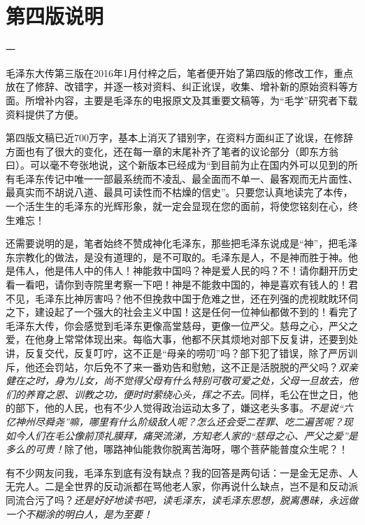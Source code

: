\documentclass[../../dazhuan.tex]{subfiles}
\begin{document}
\clearpage
\chapter*{第四版说明}

{\centering {}\kaishu 一 \par}                            
                        
毛泽东大传第三版在2016年1月付梓之后，笔者便开始了第四版的修改工作，重点放在了修辞、改错字，并逐一核对资料、纠正讹误，收集、增补新的原始资料等方面。所增补内容，主要是毛泽东的电报原文及其重要文稿等，为“毛学”研究者下载资料提供了方便。

第四版文稿已近700万字，基本上消灭了错别字，在资料方面纠正了讹误，在修辞方面也有了很大的变化，还在每一章的末尾补齐了笔者的议论部分（即东方翁曰）。可以毫不夸张地说，这个新版本已经成为“到目前为止在国内外可以见到的所有毛泽东传记中唯一一部最系统而不凌乱、最全面而不单一、最客观而无片面性、最真实而不胡说八道、最具可读性而不枯燥的信史”。只要您认真地读完了本传，一个活生生的毛泽东的光辉形象，就一定会显现在您的面前，将使您铭刻在心，终生难忘！

还需要说明的是，笔者始终不赞成神化毛泽东，那些把毛泽东说成是“神”，把毛泽东宗教化的做法，是没有道理的，是不可取的。毛泽东是人，不是神而胜于神。他是伟人，他是伟人中的伟人！神能救中国吗？神是爱人民的吗？不！请你翻开历史看一看吧，请你到寺院里考察一下吧！神是不能救中国的，神是喜欢有钱人的！君不见，毛泽东比神厉害吗？他不但挽救中国于危难之世，还在列强的虎视眈眈环伺之下，建设起了一个强大的社会主义中国！这是任何一位神仙都做不到的！看完了毛泽东大传，你会感觉到毛泽东更像高堂慈母，更像一位严父。慈母之心，严父之爱，在他身上常常体现出来。每临大事，他都不厌其烦地对部下反复讲，还要到处讲，反复交代，反复叮咛，这不正是“母亲的唠叨”吗？部下犯了错误，除了严厉训斥，他还会罚站，尔后免不了来一番劝告和慰勉，这不正是活脱脱的严父吗？\emph{双亲健在之时，身为儿女，尚不觉得父母有什么特别可敬可爱之处，父母一旦故去，他们的养育之恩、训教之功，便时时萦绕心头，挥之不去。}同样，毛公在世之日，他的部下，他的人民，也有不少人觉得政治运动太多了，嫌这老头多事。\emph{不是说“六亿神州尽舜尧”嘛，哪里有什么阶级敌人呢？怎么还会受二茬罪、吃二遍苦呢？现如今人们在毛公像前顶礼膜拜，痛哭流涕，方知老人家的“慈母之心、严父之爱”是多么的可贵！}除了他，哪路神仙能救你脱离苦海呀，哪个菩萨能普度众生呢？！

有不少网友问我，毛泽东到底有没有缺点？我的回答是两句话：一是金无足赤、人无完人。二是全世界的反动派都在骂他老人家，你再说什么缺点，岂不是和反动派同流合污了吗？\emph{还是好好地读书吧，读毛泽东，读毛泽东思想，脱离愚昧，永远做一个不糊涂的明白人，是为至要！}
\end{document}
